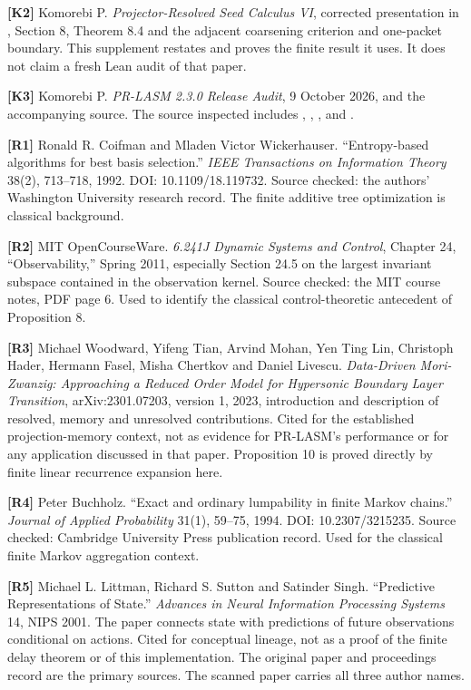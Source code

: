 \documentclass[11pt,oneside,openany]{book}
\numberwithin{equation}{section}
\begin{document}
\textbf{{[}K2{]}} Komorebi P. \emph{Projector-Resolved Seed Calculus
VI}, corrected presentation in
, Section 8, Theorem 8.4
and the adjacent coarsening criterion and one-packet boundary. This
supplement restates and proves the finite result it uses. It does not
claim a fresh Lean audit of that paper.

\textbf{{[}K3{]}} Komorebi P. \emph{PR-LASM 2.3.0 Release Audit}, 9
October 2026, and the accompanying source. The source inspected includes
, ,
,  and
.

\textbf{{[}R1{]}} Ronald R. Coifman and Mladen Victor Wickerhauser.
``Entropy-based algorithms for best basis selection.'' \emph{IEEE
Transactions on Information Theory} 38(2), 713--718, 1992. DOI:
10.1109/18.119732. Source checked: the authors' Washington University
research record. The finite additive tree optimization is classical
background.

\textbf{{[}R2{]}} MIT OpenCourseWare. \emph{6.241J Dynamic Systems and
Control}, Chapter 24, ``Observability,'' Spring 2011, especially Section
24.5 on the largest invariant subspace contained in the observation
kernel. Source checked: the MIT course notes, PDF page 6. Used to
identify the classical control-theoretic antecedent of Proposition 8.

\textbf{{[}R3{]}} Michael Woodward, Yifeng Tian, Arvind Mohan, Yen Ting
Lin, Christoph Hader, Hermann Fasel, Misha Chertkov and Daniel Livescu.
\emph{Data-Driven Mori-Zwanzig: Approaching a Reduced Order Model for
Hypersonic Boundary Layer Transition}, arXiv:2301.07203, version 1,
2023, introduction and description of resolved, memory and unresolved
contributions. Cited for the established projection-memory context, not
as evidence for PR-LASM's performance or for any application discussed
in that paper. Proposition 10 is proved directly by finite linear
recurrence expansion here.

\textbf{{[}R4{]}} Peter Buchholz. ``Exact and ordinary lumpability in
finite Markov chains.'' \emph{Journal of Applied Probability} 31(1),
59--75, 1994. DOI: 10.2307/3215235. Source checked: Cambridge University
Press publication record. Used for the classical finite Markov
aggregation context.

\textbf{{[}R5{]}} Michael L. Littman, Richard S. Sutton and Satinder
Singh. ``Predictive Representations of State.'' \emph{Advances in Neural
Information Processing Systems} 14, NIPS 2001. The paper connects state
with predictions of future observations conditional on actions. Cited
for conceptual lineage, not as a proof of the finite delay theorem or of
this implementation. The original paper and proceedings record are the
primary sources. The scanned paper carries all three author names.
\end{document}
